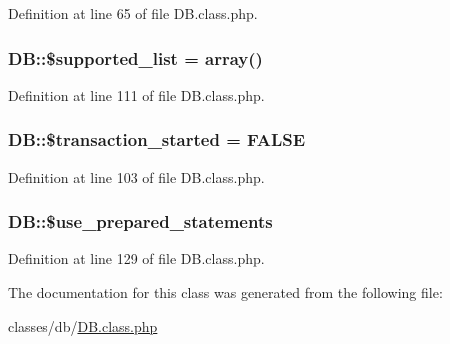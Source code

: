 Definition at line 65 of file D\-B.\-class.\-php.

\hypertarget{classDB_ac09dd547a22963632e063c9ab68b7707}{
\subsubsection[{\$supported\-\_\-list}]{\setlength{\rightskip}{0pt plus 5cm}D\-B\-::\$supported\-\_\-list = array()\hspace{0.3cm}{\ttfamily [static]}}}\label{classDB_ac09dd547a22963632e063c9ab68b7707}


Definition at line 111 of file D\-B.\-class.\-php.

\hypertarget{classDB_a39a0eef56f82082ca4c69bcad1f12a31}{
\subsubsection[{\$transaction\-\_\-started}]{\setlength{\rightskip}{0pt plus 5cm}D\-B\-::\$transaction\-\_\-started = F\-A\-L\-S\-E}}\label{classDB_a39a0eef56f82082ca4c69bcad1f12a31}


Definition at line 103 of file D\-B.\-class.\-php.

\hypertarget{classDB_a9902aee7d8900a597670fce92c7eb74b}{
\subsubsection[{\$use\-\_\-prepared\-\_\-statements}]{\setlength{\rightskip}{0pt plus 5cm}D\-B\-::\$use\-\_\-prepared\-\_\-statements}}\label{classDB_a9902aee7d8900a597670fce92c7eb74b}


Definition at line 129 of file D\-B.\-class.\-php.



The documentation for this class was generated from the following file\-:\begin{DoxyCompactItemize}
\item 
classes/db/\hyperlink{DB_8class_8php}{D\-B.\-class.\-php}\end{DoxyCompactItemize}
